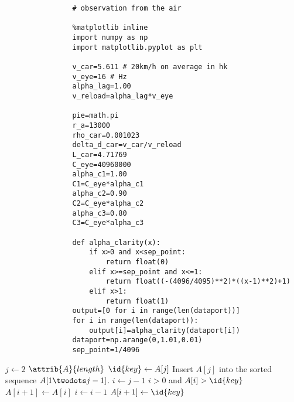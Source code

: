 \documentclass{article}
\begin{document}
        \begin{lstlisting}
                # observation from the air

                %matplotlib inline
                import numpy as np
                import matplotlib.pyplot as plt

                v_car=5.611 # 20km/h on average in hk
                v_eye=16 # Hz
                alpha_lag=1.00
                v_reload=alpha_lag*v_eye

                pie=math.pi
                r_a=13000
                rho_car=0.001023
                delta_d_car=v_car/v_reload
                L_car=4.71769
                C_eye=40960000
                alpha_c1=1.00
                C1=C_eye*alpha_c1
                alpha_c2=0.90
                C2=C_eye*alpha_c2
                alpha_c3=0.80
                C3=C_eye*alpha_c3

                def alpha_clarity(x):
                    if x>0 and x<sep_point:
                        return float(0)
                    elif x>=sep_point and x<=1:
                        return float((-(4096/4095)**2)*((x-1)**2)+1)
                    elif x>1:
                        return float(1)
                output=[0 for i in range(len(dataport))]
                for i in range(len(dataport)):
                    output[i]=alpha_clarity(dataport[i])
                dataport=np.arange(0,1.01,0.01)
                sep_point=1/4096
        \end{lstlisting}
        \begin{codebox}
            \li \For $j \gets 2$ \To $\attrib{A}{length}$
            \li \Do
            $\id{key} \gets A[j]$
            \li \Comment Insert $A[j]$ into the sorted sequence
            $A[1 \twodots j-1]$.
            \li $i \gets j-1$
            \li \While $i > 0$ and $A[i] > \id{key}$
            \li \Do
            $A[i+1] \gets A[i]$
            \li $i \gets i-1$
            \End
            \li $A[i+1] \gets \id{key}$
            \End
        \end{codebox}
\end{document}
